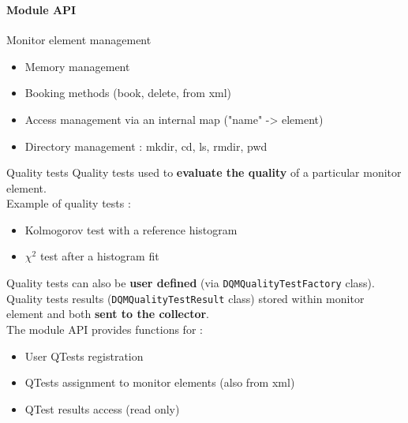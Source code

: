 \documentclass[8pt]{beamer}
\begin{document}
    \begin{frame}[containsverbatim]
      \frametitle{\secname}
      \framesubtitle{Module API}

      \begin{block}{Monitor element management}
        \begin{itemize}
          \item Memory management
          \item Booking methods (book, delete, from xml)
          \item Access management via an internal map ("name" -> element)
          \item Directory management : mkdir, cd, ls, rmdir, pwd
        \end{itemize}
      \end{block}

      \begin{block}{Quality tests}
        Quality tests used to \textbf{evaluate the quality} of a particular monitor element. \\
        Example of quality tests :
        \begin{itemize}
          \item Kolmogorov test with a reference histogram
          \item $\chi^2$ test after a histogram fit
        \end{itemize}
        Quality tests can also be \textbf{user defined} (via \verb|DQMQualityTestFactory| class). \\
        Quality tests results (\verb|DQMQualityTestResult| class) stored within monitor element and both \textbf{sent to the collector}. \\
        The module API provides functions for :
        \begin{itemize}
          \item User QTests registration
          \item QTests assignment to monitor elements (also from xml)
          \item QTest results access (read only)
        \end{itemize}
      \end{block}
    \end{frame}
\end{document}
